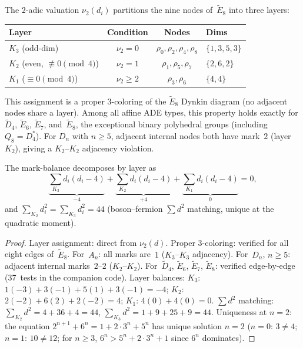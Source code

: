 \begin{theorem}\label{thm:2adic}
The $2$-adic valuation $\nu_2(d_i)$ partitions the nine nodes of~$\tilde{E}_8$
into three layers:
\begin{center}
\begin{tabular}{lccl}
Layer & Condition & Nodes & Dims \\
\hline
$K_3$ (odd-dim) & $\nu_2 = 0$ & $\rho_0,\rho_2,\rho_4,\rho_8$ & $\{1,3,5,3\}$ \\
$K_2$ (even, $\not\equiv 0\!\pmod{4}$) & $\nu_2 = 1$ & $\rho_1,\rho_5,\rho_7$ & $\{2,6,2\}$ \\
$K_1$ ($\equiv 0\!\pmod{4}$) & $\nu_2 \geq 2$ & $\rho_3,\rho_6$ & $\{4,4\}$ \\
\end{tabular}
\end{center}
This assignment is a proper $3$-coloring of the $\tilde{E}_8$ Dynkin diagram
(no adjacent nodes share a layer).
Among all affine ADE types, this property holds exactly for
$\tilde{D}_4$, $\tilde{E}_6$, $\tilde{E}_7$, and~$\tilde{E}_8$, the
exceptional binary polyhedral groups (including~$Q_8 = D_4^*$).
For $D_n$ with $n \geq 5$, adjacent internal nodes both have mark~$2$
(layer~$K_2$), giving a $K_2$--$K_2$ adjacency violation.

The mark-balance decomposes by layer as
\begin{equation}\label{eq:supertrace}
  \underbrace{\sum_{K_3} d_i(d_i-4)}_{-4}
  + \underbrace{\sum_{K_2} d_i(d_i-4)}_{+4}
  + \underbrace{\sum_{K_1} d_i(d_i-4)}_{0}
  = 0,
\end{equation}
and $\sum_{K_2} d_i^2 = \sum_{K_3} d_i^2 = 44$
(boson--fermion $\sum d^2$ matching, unique at the quadratic moment).
\end{theorem}

\begin{proof}
Layer assignment: direct from $\nu_2(d)$.
Proper $3$-coloring: verified for all eight edges of~$\tilde{E}_8$.
For~$A_n$: all marks are~$1$ ($K_3$--$K_3$ adjacency).
For~$D_n$, $n \geq 5$: adjacent internal marks~$2$--$2$ ($K_2$--$K_2$).
For~$\tilde{D}_4$, $\tilde{E}_6$, $\tilde{E}_7$, $\tilde{E}_8$:
verified edge-by-edge (37~tests in the companion code).
Layer balances: $K_3$: $1(-3)+3(-1)+5(1)+3(-1) = -4$;
$K_2$: $2(-2)+6(2)+2(-2) = 4$; $K_1$: $4(0)+4(0) = 0$.
$\sum d^2$ matching: $\sum_{K_2} d^2 = 4+36+4 = 44$,
$\sum_{K_3} d^2 = 1+9+25+9 = 44$.
Uniqueness at $n=2$: the equation
$2^{n+1} + 6^n = 1 + 2 \cdot 3^n + 5^n$
has unique solution $n = 2$
($n = 0$: $3 \ne 4$; $n = 1$: $10 \ne 12$;
for $n \ge 3$, $6^n > 5^n + 2 \cdot 3^n + 1$ since $6^n$ dominates).
\end{proof}

